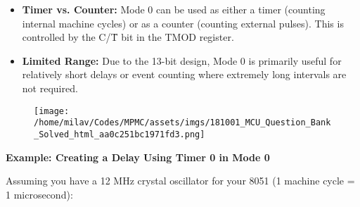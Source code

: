 \documentclass[
]{article}
\begin{document}
\begin{itemize}
\item
  \textbf{Timer vs. Counter:} Mode 0 can be used as either a timer
  (counting internal machine cycles) or as a counter (counting external
  pulses). This is controlled by the C/T̄ bit in the TMOD register.
\item
  \textbf{Limited Range:} Due to the 13-bit design, Mode 0 is primarily
  useful for relatively short delays or event counting where extremely
  long intervals are not required.
\end{itemize}

\begin{figure}
\centering
\texttt{[image: /home/milav/Codes/MPMC/assets/imgs/181001\_MCU\_Question\_Bank\_Solved\_html\_aa0c251bc1971fd3.png]}
\caption{}
\end{figure}

\textbf{Example: Creating a Delay Using Timer 0 in Mode 0}

Assuming you have a 12 MHz crystal oscillator for your 8051 (1 machine
cycle = 1 microsecond):
\end{document}
